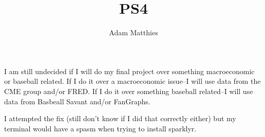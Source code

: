 \documentclass{article}
\title{PS4}
\author{Adam Matthies}
\begin{document}
\maketitle

I am still undecided if I will do my final project over something macroeconomic or baseball related. If I do it over a macroeconomic issue--I will use data from the CME group and/or FRED. If I do it over something baseball related--I will use data from Basbeall Savant and/or FanGraphs.

I attempted the fix (still don't know if I did that correctly either) but my terminal would have a spasm when trying to install sparklyr.
\end{document}
